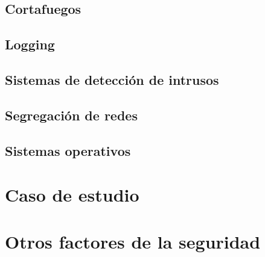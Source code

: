 \documentclass[11pt,a4paper]{article}
\begin{document}
\subsection{Cortafuegos}

\subsection{Logging}

\subsection{Sistemas de detección de intrusos}

\subsection{Segregación de redes}

\subsection{Sistemas operativos}

\section{Caso de estudio}

\section{Otros factores de la seguridad}
\end{document}

